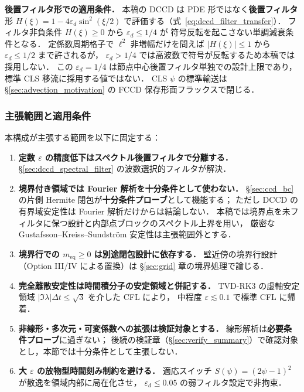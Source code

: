 \noindent\textbf{後置フィルタ形での適用条件．}
本稿の DCCD は PDE 形ではなく\textbf{後置フィルタ}形
$H(\xi) = 1 - 4\varepsilon_d\sin^2(\xi/2)$ で評価する（式~\eqref{eq:dccd_filter_transfer}）．
フィルタ非負条件 $H(\xi)\ge 0$ から $\varepsilon_d\le 1/4$ が
符号反転を起こさない単調減衰条件となる．
定係数周期格子で $\ell^2$ 非増幅だけを問えば
$|H(\xi)|\le 1$ から $\varepsilon_d\le 1/2$ まで許されるが，
$\varepsilon_d>1/4$ では高波数で符号が反転するため本稿では採用しない．
この $\varepsilon_d=1/4$ は節点中心後置フィルタ単独での設計上限であり，
標準 CLS 移流に採用する値ではない．
CLS $\psi$ の標準輸送は §\ref{sec:advection_motivation} の
FCCD 保存形面フラックスで閉じる．

\subsubsection{主張範囲と適用条件}
\label{sec:dccd_rebuttals}

本構成が主張する範囲を以下に固定する：

\begin{enumerate}[label=\textbf{D-\arabic*.}]
\item \textbf{定数 $\varepsilon$ の精度低下はスペクトル後置フィルタで分離する．}
      §\ref{sec:dccd_spectral_filter} の波数選択的フィルタが解決．
\item \textbf{境界付き領域では Fourier 解析を十分条件として使わない．}
      §\ref{sec:ccd_bc} の片側 Hermite 閉包が\textbf{十分条件プローブ}として機能する；
      ただし DCCD の有界域安定性は Fourier 解析だけからは結論しない．
      本稿では境界点を未フィルタに保つ設計と内部点ブロックのスペクトル上界を用い，
      厳密な Gustafsson--Kreiss--Sundstr\"om 安定性は主張範囲外とする．
\item \textbf{境界行での $m_{\text{eq}}\ge 0$ は別途閉包設計に依存する．}
      壁近傍の境界行設計（Option III/IV による置換）は
      §\ref{sec:grid} 章の境界処理で論じる．
\item \textbf{完全離散安定性は時間積分子の安定領域と併記する．}
      TVD-RK3 の虚軸安定領域 $|\Im\lambda|\Delta t\le\sqrt{3}$ を介した CFL により，
      中程度 $\varepsilon\lesssim 0.1$ で標準 CFL に帰着．
\item \textbf{非線形・多次元・可変係数への拡張は検証対象とする．}
      線形解析は\textbf{必要条件プローブ}に過ぎない；
      後続の検証章（§\ref{sec:verify_summary}）で確認対象とし，本節では十分条件として主張しない．
\item \textbf{大 $\varepsilon$ の放物型時間刻み制約を避ける．}
      適応スイッチ $S(\psi)=(2\psi-1)^2$ が散逸を領域内部に局在化させ，
      $\varepsilon_d\le 0.05$ の弱フィルタ設定で非拘束．
\end{enumerate}

